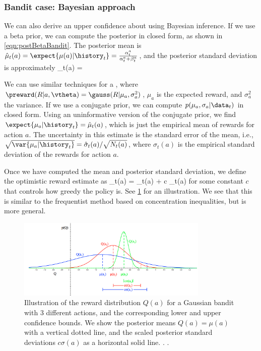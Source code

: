 \subsubsection{Bandit case: Bayesian approach}

We can also derive an upper confidence about using  Bayesian inference.
If we use a beta prior, we can compute the posterior in closed form,
as shown in \cref{eqn:postBetaBandit}.
The posterior mean is
$\hat{\mu}_t(a) = \expect{\mu(a)|\history_t}=\frac{\alpha_t^a}{\alpha_t^a+\beta_t^a}$,
and 
the posterior standard deviation is approximately
\be
\hat{\sigma}_t(a) = 
\approx {}
\ee

We can use similar techniques for a
,
where
$\preward(R|a,\vtheta) = \gauss(R|\mu_a,  \sigma_a^2)$,
$\mu_a$ is the expected reward, and $\sigma_a^2$ the variance.
If we use a conjugate prior,
we can compute $p(\mu_a,\sigma_a|\data_t)$
in closed form.
Using an uninformative version of the conjugate prior,
we find
$\expect{\mu_a|\history_t}=\hat{\mu}_t(a)$,
which is just the empirical mean of rewards for action $a$.
The uncertainty in this estimate
is the  standard error of the mean,
i.e., 
$\sqrt{\var{\mu_a|\history_t}} =\hat{\sigma}_t(a)/\sqrt{N_t(a)}$,
where $\hat{\sigma}_t(a)$ is the empirical standard
deviation of the rewards for action $a$.


Once we have computed the mean and posterior standard
deviation, we define the optimistic reward estimate as
\be
\optR_t(a) = \hat{\mu}_t(a) + c \hat{\sigma}_t(a)
\label{eqn:UCBbandit}
\ee
for some constant $c$ that controls how greedy the policy is.
See \cref{fig:UCB}  for an illustration.
We see that this is similar to the frequentist method based on
concentration inequalities, but is more general.


\begin{figure}
\centering
\includegraphics[height=1.5in]{figs/silver-UCB}
\caption{
Illustration of the reward distribution $Q(a)$
for a Gaussian bandit with 3 different actions,
and the corresponding lower and upper confidence bounds.
We show the posterior means $Q(a) = \mu(a)$ with a vertical
dotted line, and the scaled posterior standard deviations $c \sigma(a)$
as a horizontal solid line.
  .
.
}
\label{fig:UCB}
\end{figure}


